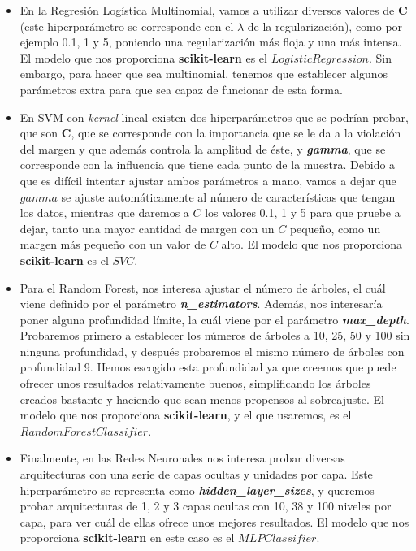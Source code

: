 \documentclass[11pt,a4paper]{article}
\begin{document}
\begin{itemize}[label=\textbullet]
    \item En la Regresión Logística Multinomial, vamos a utilizar diversos valores de \textbf{C} (este hiperparámetro se corresponde con el $\lambda$ de
    la regularización), como por ejemplo 0.1, 1 y 5, poniendo una regularización más floja y una más intensa. El modelo que nos proporciona
    \textbf{scikit-learn} es el $LogisticRegression$. Sin embargo, para hacer que sea multinomial, tenemos que establecer algunos parámetros
    extra para que sea capaz de funcionar de esta forma.
    \item En SVM con \textit{kernel} lineal existen dos hiperparámetros que se podrían probar, que son \textbf{C}, que se corresponde con la importancia
    que se le da a la violación del margen y que además controla la amplitud de éste, y \textbf{\textit{gamma}}, que se corresponde con la influencia que tiene cada
    punto de la muestra. Debido a que es difícil intentar ajustar ambos parámetros a mano, vamos a dejar que $gamma$ se ajuste automáticamente al
    número de características que tengan los datos, mientras que daremos a $C$ los valores 0.1, 1 y 5 para que pruebe a dejar, tanto una mayor
    cantidad de margen con un $C$ pequeño, como un margen más pequeño con un valor de $C$ alto. El modelo que nos proporciona \textbf{scikit-learn}
    es el $SVC$.
    \item Para el Random Forest, nos interesa ajustar el número de árboles, el cuál viene definido por el parámetro \textit{\textbf{n\_estimators}}. Además,
    nos interesaría poner alguna profundidad límite, la cuál viene por el parámetro  \textit{\textbf{max\_depth}}. Probaremos primero a establecer los
    números de árboles a 10, 25, 50 y 100 sin ninguna profundidad, y después probaremos el mismo número de árboles con profundidad 9. Hemos escogido
    esta profundidad ya que creemos que puede ofrecer unos resultados relativamente buenos, simplificando los árboles creados bastante y haciendo
    que sean menos propensos al sobreajuste. El modelo que nos proporciona \textbf{scikit-learn}, y el que usaremos, es el $RandomForestClassifier$.
    \item Finalmente, en las Redes Neuronales nos interesa probar diversas arquitecturas con una serie de capas ocultas y unidades por capa.
    Este hiperparámetro se representa como \textbf{\textit{hidden\_layer\_sizes}}, y queremos probar arquitecturas de 1, 2 y 3 capas ocultas con 10, 38 y
    100 niveles por capa, para ver cuál de ellas ofrece unos mejores resultados. El modelo que nos proporciona \textbf{scikit-learn} en este
    caso es el $MLPClassifier$.
\end{itemize}
\end{document}
